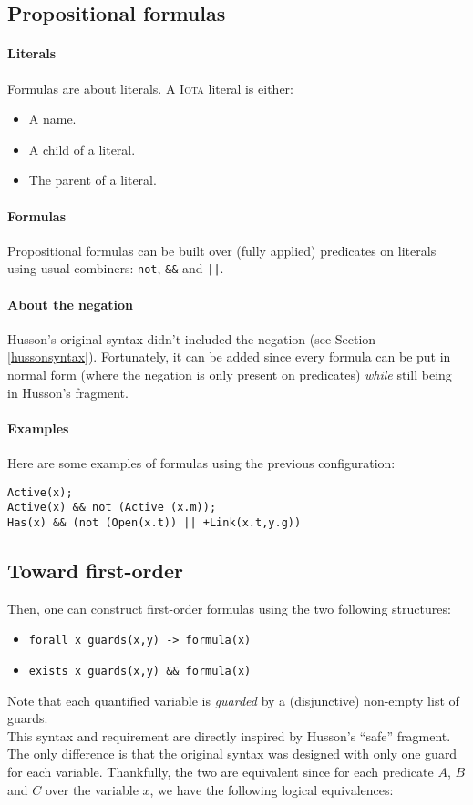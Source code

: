 \documentclass[10pt,a4paper]{article}
\newcommand\Iota{\textsc{Iota}}
\newcommand{\ocaml}{\texttt}
\begin{document}
\subsection{Propositional formulas}
\paragraph{Literals}
Formulas are about literals. A \Iota{} literal is either:
\begin{multicols}{2}
  \begin{itemize}
  \item A name.
  \item A child of a literal.
  \item The parent of a literal.
  \end{itemize}
\end{multicols}

\paragraph{Formulas}
Propositional formulas can be built over (fully applied) predicates on literals using usual combiners: \ocaml{not}, \ocaml{&&} and \ocaml{||}.

\paragraph{About the negation}
Husson's original syntax didn't included the negation (see Section \ref{hussonsyntax}). Fortunately, it can be added since every formula can be put in normal form (where the negation is only present on predicates) \emph{while} still being in Husson's fragment.

\paragraph{Examples}
Here are some examples of formulas using the previous configuration:
\begin{verbatim}
Active(x);
Active(x) && not (Active (x.m));
Has(x) && (not (Open(x.t)) || +Link(x.t,y.g))
\end{verbatim}

\subsection{Toward first-order}
Then, one can construct first-order formulas using the two following structures:
\begin{itemize}
\item \ocaml{forall x guards(x,y) -> formula(x)}
\item \ocaml{exists x guards(x,y) && formula(x)}
\end{itemize}
Note that each quantified variable is \emph{guarded} by a (disjunctive) non-empty list of guards.\\
This syntax and requirement are directly inspired by Husson's ``safe'' fragment. The only difference is that the original syntax was designed with only one guard for each variable. Thankfully, the two are equivalent since for each predicate $A$, $B$ and $C$ over the variable $x$, we have the following logical equivalences:
\end{document}
